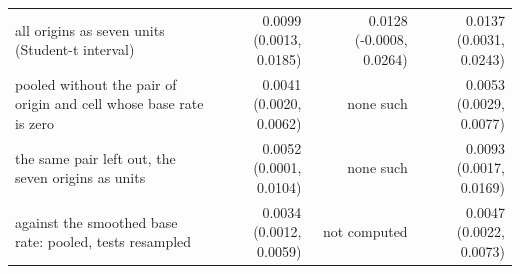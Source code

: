 \begin{tabular}{lrrr}
all origins as seven units (Student-t interval) & 0.0099 (0.0013, 0.0185) & 0.0128 (-0.0008, 0.0264) & 0.0137 (0.0031, 0.0243) \\
pooled without the pair of origin and cell whose base rate is zero & 0.0041 (0.0020, 0.0062) & none such & 0.0053 (0.0029, 0.0077) \\
the same pair left out, the seven origins as units & 0.0052 (0.0001, 0.0104) & none such & 0.0093 (0.0017, 0.0169) \\
\midrule
against the smoothed base rate: pooled, tests resampled & 0.0034 (0.0012, 0.0059) & not computed & 0.0047 (0.0022, 0.0073) \\

\end{tabular}
